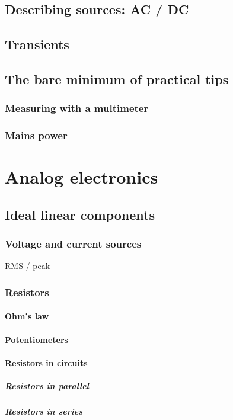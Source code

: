 \documentclass{report}
\begin{document}
\chapter{Describing sources: AC / DC}

\chapter{Transients}
\chapter{The bare minimum of practical tips}
\section{Measuring with a multimeter}
\section{Mains power}

\part{Analog electronics}
\chapter{Ideal linear components}
\section{Voltage and current sources}
RMS / peak
\section{Resistors}
\subsection{Ohm's law}
\subsection{Potentiometers}
\subsection{Resistors in circuits}
\subsubsection{Resistors in parallel}
\subsubsection{Resistors in series}
\end{document}
